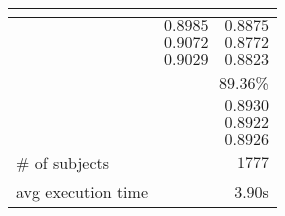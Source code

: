 
\begin{tabular}{lrr}    
    \toprule
    \REFACTORY{}& \multicolumn{1}{c}{\BUG{}}    & \multicolumn{1}{c}{\NOBUG{}}  \\\midrule
    \PRECISION{}    & $0.8985$                      & $0.8875$                      \\
    \rowcolor{row}\RECALL{}       & $0.9072$                      & $0.8772$                      \\
    \FONESCORE{}    & $0.9029$                      & $0.8823$                      \\\midrule
    \rowcolor{row}\ACCURACY{}             & \multicolumn{2}{r}{$89.36$\%} \\
    \MACRO{} \PRECISION{}   & \multicolumn{2}{r}{$0.8930$}  \\
    \rowcolor{row}\MACRO{} \RECALL{}      & \multicolumn{2}{r}{$0.8922$}  \\
    \MACRO{} \FONESCORE{}   & \multicolumn{2}{r}{$0.8926$}  \\\midrule
    \rowcolor{row}\# of subjects          & \multicolumn{2}{r}{$1777$}   \\
    avg execution time      & \multicolumn{2}{r}{$3.90$s}  \\\bottomrule
\end{tabular}